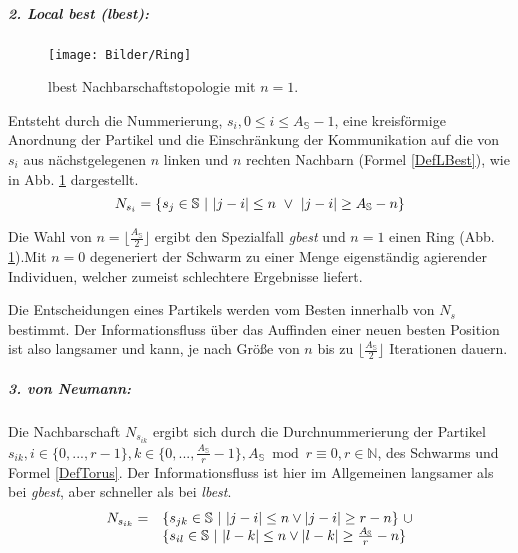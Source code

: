 \subparagraph{2. Local best (lbest):}
  \begin{figure}[!t]
    \centering
    \texttt{[image: Bilder/Ring]}
    \caption{lbest Nachbarschaftstopologie mit $n=1$.}
    \label{Topologie_Ring}
  \end{figure}
  Entsteht durch die Nummerierung, $s_i, 0\leq i\leq A_\mathbb{S}-1$, eine kreisförmige Anordnung der Partikel und die Einschränkung der Kommunikation auf die von $s_i$ aus nächstgelegenen $n$ linken und $n$ rechten Nachbarn (Formel \ref{DefLBest}), wie in Abb. \ref{Topologie_Ring} dargestellt. \cite{Huang2005}
  \begin{equation}\label{DefLBest}
    N_{s_i} = \{s_j\in\mathbb{S} \textrm{\space}\vert\textrm{\space}|j-i| \leq n \textrm{\space}\vee\textrm{\space} |j-i| \geq A_\mathbb{S}-n \}
  \end{equation}
  
  \noindent Die Wahl von $n = \lfloor\frac{A_\mathbb{S}}{2}\rfloor$ ergibt den Spezialfall \textit{gbest} und $n=1$ einen Ring (Abb. \ref{Topologie_Ring}).\linebreak Mit $n=0$ degeneriert der Schwarm zu einer Menge eigenständig agierender Individuen, welcher zumeist schlechtere Ergebnisse liefert.
  
  Die Entscheidungen eines Partikels werden vom Besten innerhalb von $N_s$ bestimmt. Der Informationsfluss über das Auffinden einer neuen besten Position ist also langsamer und kann, je nach Größe von $n$ bis zu $\lfloor\frac{A_\mathbb{S}}{2}\rfloor$ Iterationen dauern. \cite{Eberhart2001}

\subparagraph{3. von Neumann:}
  Die Nachbarschaft $N_{s_{ik}}$ ergibt sich durch die Durchnummerierung der Partikel $s_{ik}, i\in\{0, ..., r-1\}, k\in\{0, ..., \frac{A_\mathbb{S}}{r}-1\}, A_\mathbb{S}\bmod r\equiv 0, r\in\mathbb{N}$, des Schwarms und Formel \ref{DefTorus}.
  Der Informationsfluss ist hier im Allgemeinen langsamer als bei \textit{gbest}, aber schneller als bei \textit{lbest}. \cite{Huang2005}
  \begin{equation}\label{DefTorus}
    \begin{array}{ll}
      N_{s_{ik}} = & \{s_{jk}\in\mathbb{S} \textrm{\space}\vert\textrm{\space}|j-i| \leq n \vee |j-i| \geq r-n \}\textrm{\space}\cup\\
      		& \{s_{il}\in\mathbb{S} \textrm{\space}\vert\textrm{\space}|l-k| \leq n \vee |l-k| \geq \frac{A_\mathbb{S}}{r}-n\}\\
    \end{array}
  \end{equation}
  
